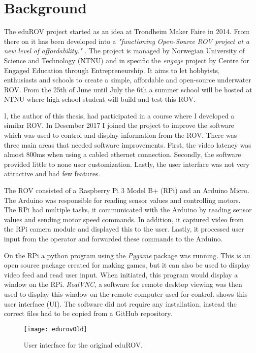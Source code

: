 \section{Background}

The eduROV project started as an idea at Trondheim Maker Faire in 2014. From there on it has been developed into a \emph{"functioning Open-Source ROV project at a new level of affordability."} \citep{edurov}. The project is managed by Norwegian University of Science and Technology (NTNU) and in specific the \emph{engage} project by Centre for Engaged Education through Entrepreneurship. It aims to let hobbyists, enthusiasts and schools to create a simple, affordable and open-source underwater ROV. From the 25th of June until July the 6th a summer school will be hosted at NTNU where high school student will build and test this ROV.

I, the author of this thesis, had participated in a course where I developed a similar ROV. In Desember 2017 I joined the project to improve the software which was used to control and display information from the ROV. There was three main areas that needed software improvements. First, the video latency was almost 800ms when using a cabled ethernet connection. Secondly, the software provided little to none user customization. Lastly, the user interface was not very attractive and had few features.

The ROV consisted of a Raspberry Pi 3 Model B+ (RPi) and an Arduino Micro. The Arduino was responsible for reading sensor values and controlling motors. The RPi had multiple tasks, it communicated with the Arduino by reading sensor values and sending motor speed commands. In addition, it captured video from the RPi camera module and displayed this to the user. Lastly, it processed user input from the operator and forwarded these commands to the Arduino.

On the RPi a python program using the \emph{Pygame} package was running. This is an open source package created for making games, but it can also be used to display video feed and read user input. When initiated, this program would display a window on the RPi. \emph{RealVNC}, a software for remote desktop viewing was then used to display this window on the remote computer used for control.  shows this user interface (UI). The software did not require any installation, instead the correct files had to be copied from a GitHub repository.

\begin{figure}[h!]
    \centering
    \texttt{[image: edurovOld]}
    \caption{User interface for the original eduROV.}
    \label{edurovOld}
\end{figure}

